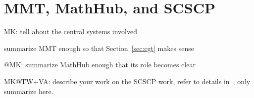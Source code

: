 \section{MMT, MathHub, and SCSCP}\label{sec:sys}
\begin{todolist}{MK: tell about the central systems involved}
\item summarize MMT enough so that Section~\ref{sec:cgt} makes sense
\item @MK: summarize MathHub enough that its role becomes clear
\item MK@TW+VA: describe your work on the SCSCP work, refer to details
  in~\cite{twiesing:msc17}, only summarize here.
\end{todolist}

